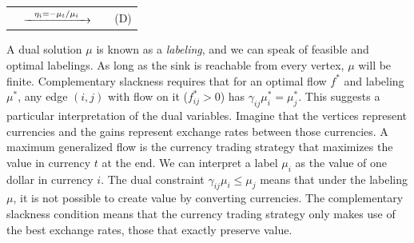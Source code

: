 \documentclass[11pt]{article}
\theoremstyle{definition}
\theoremstyle{definition}
\newcommand{\R}{\mathbb{R}}
\newcommand{\gij}{\gamma_{ij}}
\begin{document}
	\begin{tabular}{rcll}
		\hspace*{-1.05cm}
	\resizebox{0.37\textwidth}{!}{
		\fbox{
	\begin{minipage}{0.35\textwidth}
	\begin{alignat*}{3}
    \text{min} &\quad &\sum_{i \in V \setminus t} b_i \eta_i \\
    \text{s.t.}
    &   &\gij \eta_j - \eta_i &\geq 0 \quad &&\forall\; (i, j) \in E[V \setminus t] \\
    &   &\gamma_{ti} \eta_i &= -1 \quad     &&\forall\; (i, t) \in E \\
    &   &\eta_i &= -\gamma_{it} \quad       &&\forall\; (t, i) \in E \\
    &   &\eta_i &\leq 0 \quad               &&\forall\; i \in V \setminus t
    \end{alignat*}
	\end{minipage}
}
} & 
	$\xrightarrow{\hspace*{0.25cm}\eta_i = - \mu_t / \mu_i\hspace*{0.25cm}}$
	&
	\resizebox{0.37\textwidth}{!}{
		\fbox{
	\begin{minipage}{0.4\textwidth}
    \begin{alignat*}{3}
    \text{max} &\quad &\mu_t &\sum_{j \in V \setminus t} \frac{b_j}{\mu_j}  \\
    \text{s.t.}
    &   &\gij \mu_i &\leq \mu_j \quad &&\forall\; (i, j) \in E \\
    &   &\mu_i &\in \R_{>0} \cup \infty \quad &&\forall\; i \in V \setminus t \\
    &   &\mu_t &\in \R_{>0}
    \end{alignat*}
	\end{minipage}
}
} & \hspace*{0.4cm}(D)
\end{tabular}
\vspace{0.5cm}

        
	A dual solution $\mu$ is known as a \emph{labeling}, and we can speak of feasible and
	optimal labelings. As long as the sink is reachable from every vertex, $\mu$ will be finite.
	Complementary slackness requires that for an optimal flow $f^*$ and labeling $\mu^*$,
	any edge $(i, j)$ with flow on it ($f^*_{ij} > 0$) has $\gamma_{ij}\mu^*_i = \mu^*_j$.
	This suggests a particular interpretation of the dual variables. Imagine that
	the vertices represent currencies and the gains represent exchange rates between those currencies.
	A maximum generalized flow is the currency trading strategy that maximizes the value in currency
	$t$ at the end. We can interpret a label $\mu_i$ as the value of one dollar in currency $i$.
	The dual constraint $\gamma_{ij} \mu_i \leq \mu_j$ means that under the labeling $\mu$,
	it is not possible to create value by converting currencies.
	The complementary slackness condition means that the currency trading strategy
	only makes use of the best exchange rates, those that exactly preserve value.
	
\end{document}

